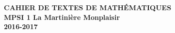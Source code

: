 \documentclass[12pt,a4paper]{article}
\begin{document}
\begin{center}
\Large\bf CAHIER DE TEXTES DE MATHÉMATIQUES\\
MPSI 1 La Martinière Monplaisir\\ 2016-2017
\end{center}
\vspace{1cm}
\vspace{.4cm}

% 
% 
% 
% 
% 
% 
% 
% 
% 

% 
%
\end{document}
